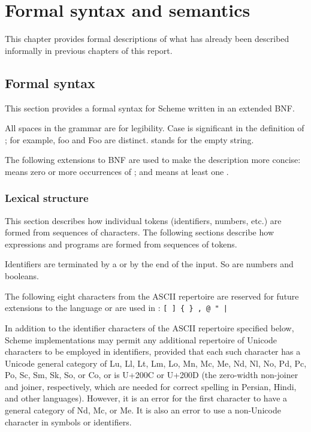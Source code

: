 \chapter{Formal syntax and semantics}
\label{formalchapter}

This chapter provides formal descriptions of what has already been
described informally in previous chapters of this report.

\section{Formal syntax}
\label{BNF}

This section provides a formal syntax for Scheme written in an extended
BNF.

All spaces in the grammar are for legibility.  Case is significant
in the definition of ; for example,  {\cf foo} and {\cf Foo}
are distinct.
 stands for the empty string.

The following extensions to BNF are used to make the description more
concise:   means zero or more occurrences of
; and  means at least one
.

\subsection{Lexical structure}

This section describes how individual tokens (identifiers,
numbers, etc.) are formed from sequences of characters.  The following
sections describe how expressions and programs are formed from sequences
of tokens.

\vest Identifiers are
terminated by a  or by the end of the input.
So are numbers and booleans.

The following eight characters from the ASCII repertoire
are reserved for future extensions to the
language or are used in \rsevenrs:
{\tt \verb"[" \verb"]" \verb"{" \verb"}" \verb',' \verb'@'
\verb'"' \verb'|'}

In addition to the identifier characters of the ASCII repertoire specified
below, Scheme implementations may permit any additional repertoire of
Unicode characters to be employed in identifiers,
provided that each such character has a Unicode general category of Lu,
Ll, Lt, Lm, Lo, Mn, Mc, Me, Nd, Nl, No, Pd, Pc, Po, Sc, Sm, Sk, So,
or Co, or is U+200C or U+200D (the zero-width non-joiner and joiner,
respectively, which are needed for correct spelling in Persian, Hindi,
and other languages).
However, it is an error for the first character to have a general category
of Nd, Mc, or Me.  It is also an error to use a non-Unicode character
in symbols or identifiers.

